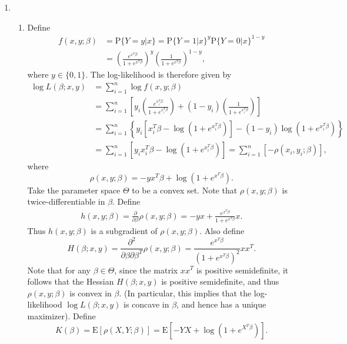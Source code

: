 \documentclass[12pt]{article}
\newcommand{\E}{\mathrm{E}}
\newcommand{\Prob}{\mathrm{P}}
\begin{document}
\begin{enumerate}
\item
\begin{enumerate}[label=(\roman*)]
\item
Define
\begin{align*}
f(x, y; \beta) &= \Prob\{Y = y | x\} = \Prob\{Y = 1 | x\}^y \Prob\{Y = 0 | x\}^{1-y} \\
&= \left(\frac{e^{x^T\beta}}{1 + e^{x^T\beta}}\right)^y \left(\frac{1}{1 + e^{x^T\beta}}\right)^{1-y},
\end{align*}
where $y \in \{0, 1\}$. The log-likelihood is therefore given by
\begin{align*}
\log L(\beta; x, y) &= \sum_{i=1}^n \log f(x, y; \beta) \\
&= \sum_{i=1}^n \left[y_i \left(\frac{e^{x_i^T\beta}}{1 + e^{x_i^T\beta}}\right) + (1-y_i) \left(\frac{1}{1 + e^{x_i^T\beta}}\right) \right] \\
&= \sum_{i=1}^n \left\{y_i\left[x_i^T\beta - \log(1 + e^{x_i^T\beta})\right] - (1 - y_i)\log(1 + e^{x_i^T\beta})\right\} \\
&= \sum_{i=1}^n \left[y_i x_i^T\beta - \log(1 + e^{x_i^T\beta})\right] = \sum_{i=1}^n [-\rho(x_i, y_i; \beta)],
\end{align*}
where
\begin{equation*}
\rho(x, y; \beta) = -y x^T\beta + \log(1 + e^{x^T\beta}).
\end{equation*}
Take the parameter space $\Theta$ to be a convex set. Note that $\rho(x, y; \beta)$ is twice-differentiable in $\beta$. Define
\begin{align*}
h(x, y; \beta) = \frac{\partial}{\partial \beta} \rho(x, y; \beta) = -yx + \frac{e^{x^T\beta}}{1 + e^{x^T\beta}} x.
\end{align*}
Thus $h(x, y; \beta)$ is a subgradient of $\rho(x, y; \beta)$. Also define
\begin{equation*}
H(\beta; x, y) = \frac{\partial^2}{\partial \beta \partial \beta^T} \rho(x, y; \beta) = \frac{e^{x^T\beta}}{(1 + e^{x^T\beta})^2} xx^T.
\end{equation*}
Note that for any $\beta \in \Theta$, since the matrix $xx^T$ is positive semidefinite, it follows that the Hessian $H(\beta; x, y)$ is positive semidefinite, and thus $\rho(x, y; \beta)$ is convex in $\beta$. (In particular, this implies that the log-likelihood $\log L(\beta; x, y)$ is concave in $\beta$, and hence has a unique maximizer). Define
\begin{equation*}
K(\beta) = \E[\rho(X, Y; \beta)] = \E[-YX + \log(1 + e^{X^T\beta})].
\end{equation*}

\end{enumerate}
\end{enumerate}
\end{document}
